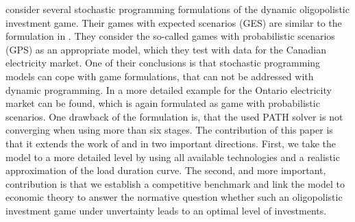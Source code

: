 \cite{Genc2007} consider several stochastic programming formulations of the dynamic oligopolistic investment game. Their games with expected scenarios (GES) are similar to the formulation in \cite{Pineau2003}. They consider the so-called games with probabilistic scenarios (GPS) as an appropriate model, which they test with data for the Canadian electricity market. One of their conclusions is that stochastic programming models can cope with game formulations, that can not be addressed with dynamic programming. In \cite{Genc2008} a more detailed example for the Ontario electricity market can be found, which is again formulated as game with probabilistic scenarios. One drawback of the formulation is, that the used PATH solver is not converging when using more than six stages.
The contribution of this paper is that it extends the work of \cite{Genc2007} and  \cite{Genc2008} in two important directions. First, we take the model to a more detailed level by using all available technologies and a realistic approximation of the load duration curve. The second, and more important, contribution is that we establish a competitive benchmark and link the model to economic theory to answer the normative question whether such an oligopolistic investment game under unvertainty leads to an optimal level of investments.






